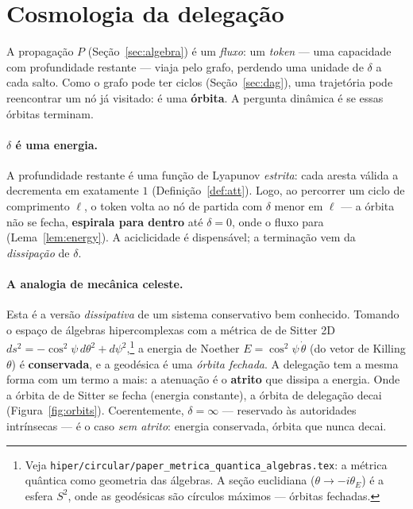 \documentclass[11pt,a4paper]{article}
\theoremstyle{definition}
\newcommand{\dep}{\delta}
\begin{document}
  \section{Cosmologia da delegação}\label{sec:orbits}

  A propagação $P$ (Seção~\ref{sec:algebra}) é um \emph{fluxo}: um \emph{token}
  --- uma capacidade com profundidade restante --- viaja pelo grafo, perdendo
  uma unidade de $\dep$ a cada salto. Como o grafo pode ter ciclos
  (Seção~\ref{sec:dag}), uma trajetória pode reencontrar um nó já visitado: é
  uma \textbf{órbita}. A pergunta dinâmica é se essas órbitas terminam.

  \paragraph{$\dep$ é uma energia.} A profundidade restante é uma função de
  Lyapunov \emph{estrita}: cada aresta válida a decrementa em exatamente $1$
  (Definição~\ref{def:att}). Logo, ao percorrer um ciclo de comprimento $\ell$,
  o token volta ao nó de partida com $\dep$ menor em $\ell$ --- a órbita não se
  fecha, \textbf{espirala para dentro} até $\dep=0$, onde o fluxo para
  (Lema~\ref{lem:energy}). A aciclicidade é dispensável; a terminação vem da
  \emph{dissipação} de $\dep$.

  \paragraph{A analogia de mecânica celeste.} Esta é a versão \emph{dissipativa}
  de um sistema conservativo bem conhecido. Tomando o espaço de álgebras
  hipercomplexas com a métrica de de Sitter 2D
  $ds^2=-\cos^2\psi\,d\theta^2+d\psi^2$,\footnote{Veja
  \texttt{hiper/circular/paper\_metrica\_quantica\_algebras.tex}: a métrica
  quântica como geometria das álgebras. A seção euclidiana ($\theta\to-i\theta_E$)
  é a esfera $S^2$, onde as geodésicas são círculos máximos --- órbitas
  fechadas.} a energia de Noether $E=\cos^2\psi\,\dot\theta$ (do vetor de Killing
  $\theta$) é \textbf{conservada}, e a geodésica é uma \emph{órbita fechada}. A
  delegação tem a mesma forma com um termo a mais: a atenuação é o
  \textbf{atrito} que dissipa a energia. Onde a órbita de de Sitter se fecha
  (energia constante), a órbita de delegação decai (Figura~\ref{fig:orbits}).
  Coerentemente, $\dep=\infty$ --- reservado às autoridades intrínsecas --- é o
  caso \emph{sem atrito}: energia conservada, órbita que nunca decai.
\end{document}
